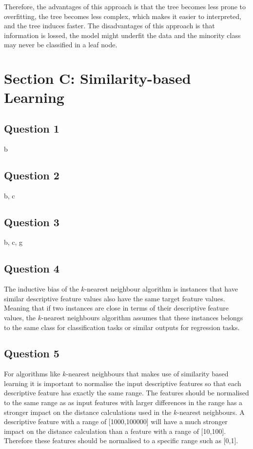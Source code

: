 \documentclass[10pt]{article}
\begin{document}
Therefore, the advantages of this approach is that the tree becomes less prone to overfitting, the
tree becomes less complex, which makes it easier to interpreted, and the tree induces faster. The disadvantages
of this approach is that information is lossed, the model might underfit the data and the minority class
may never be classified in a leaf node.

\section*{Section C: Similarity-based Learning}

\subsection*{Question 1}

b

\subsection*{Question 2}

b, c

\subsection*{Question 3}

b, c, g

\subsection*{Question 4}

The inductive bias of the $k$-nearest neighbour algorithm is instances that have similar descriptive feature values
also have the same target feature values. Meaning that if two instances are close in terms of their descriptive feature
values, the $k$-nearest neighbours algorithm assumes that these instances belongs to the same class for classification tasks
or similar outputs for regression tasks.

\subsection*{Question 5}

For algorithms like $k$-nearest neighbours that makes use of similarity based learning it is important to
normalise the input descriptive features so that each descriptive feature has exactly the same range. The
features should be normalised to the same range as as input features with larger differences in the range
has a stronger impact on the distance calculations used in the $k$-nearest neighbours. A descriptive
feature with a range of [1000,100000] will have a much stronger impact on the distance calculation
than a feature with a range of [10,100]. Therefore these features should be normalised to a specific
range such as [0,1].
\end{document}
